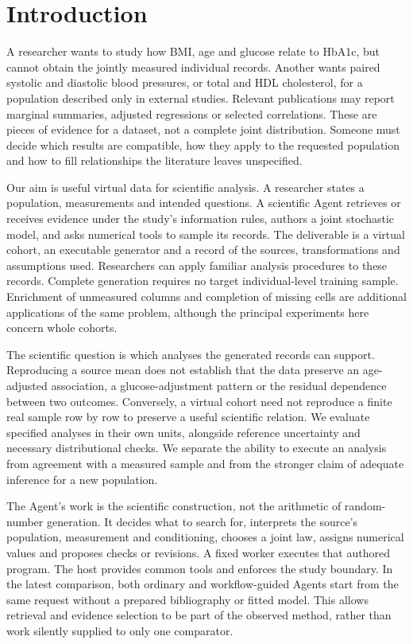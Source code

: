 \documentclass[11pt,letterpaper]{article}
\begin{document}
\section{Introduction}

A researcher wants to study how BMI, age and glucose relate to HbA1c, but cannot obtain the jointly measured individual records. Another wants paired systolic and diastolic blood pressures, or total and HDL cholesterol, for a population described only in external studies. Relevant publications may report marginal summaries, adjusted regressions or selected correlations. These are pieces of evidence for a dataset, not a complete joint distribution. Someone must decide which results are compatible, how they apply to the requested population and how to fill relationships the literature leaves unspecified.


Our aim is useful virtual data for scientific analysis. A researcher states a population, measurements and intended questions. A scientific Agent retrieves or receives evidence under the study's information rules, authors a joint stochastic model, and asks numerical tools to sample its records. The deliverable is a virtual cohort, an executable generator and a record of the sources, transformations and assumptions used. Researchers can apply familiar analysis procedures to these records. Complete generation requires no target individual-level training sample. Enrichment of unmeasured columns and completion of missing cells are additional applications of the same problem, although the principal experiments here concern whole cohorts.


The scientific question is which analyses the generated records can support. Reproducing a source mean does not establish that the data preserve an age-adjusted association, a glucose-adjustment pattern or the residual dependence between two outcomes. Conversely, a virtual cohort need not reproduce a finite real sample row by row to preserve a useful scientific relation. We evaluate specified analyses in their own units, alongside reference uncertainty and necessary distributional checks. We separate the ability to execute an analysis from agreement with a measured sample and from the stronger claim of adequate inference for a new population.


The Agent's work is the scientific construction, not the arithmetic of random-number generation. It decides what to search for, interprets the source's population, measurement and conditioning, chooses a joint law, assigns numerical values and proposes checks or revisions. A fixed worker executes that authored program. The host provides common tools and enforces the study boundary. In the latest comparison, both ordinary and workflow-guided Agents start from the same request without a prepared bibliography or fitted model. This allows retrieval and evidence selection to be part of the observed method, rather than work silently supplied to only one comparator.
\end{document}
